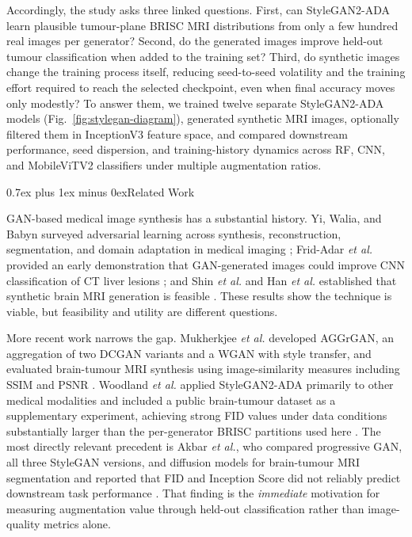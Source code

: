 \documentclass[conference,twoside]{IEEEtran}
\makeatletter
\newcommand{\figfont}{\sffamily}
\def\section{\@startsection{section}{1}{\z@}{1.5ex plus 1.5ex minus 0.5ex}%
{0.7ex plus 1ex minus 0ex}{\normalfont\normalsize\figfont\scshape\bfseries\centering}}
\makeatother
\begin{document}
Accordingly, the study asks three linked questions. First, can StyleGAN2-ADA learn plausible tumour-plane BRISC MRI distributions from only a few hundred real images per generator? Second, do the generated images improve held-out tumour classification when added to the training set? Third, do synthetic images change the training process itself, reducing seed-to-seed volatility and the training effort required to reach the selected checkpoint, even when final accuracy moves only modestly? To answer them, we trained twelve separate StyleGAN2-ADA models (Fig.~\ref{fig:stylegan-diagram}), generated synthetic MRI images, optionally filtered them in InceptionV3 feature space, and compared downstream performance, seed dispersion, and training-history dynamics across RF, CNN, and MobileViTV2 classifiers under multiple augmentation ratios.

\section{Related Work}

GAN-based medical image synthesis has a substantial history. Yi, Walia, and Babyn surveyed adversarial learning across synthesis, reconstruction, segmentation, and domain adaptation in medical imaging \cite{yi2019ganreview}; Frid-Adar \textit{et al.} provided an early demonstration that GAN-generated images could improve CNN classification of CT liver lesions \cite{fridadar2018livergan}; and Shin \textit{et al.} and Han \textit{et al.} established that synthetic brain MRI generation is feasible \cite{shin2018synthesis,han2018brainmri}. These results show the technique is viable, but feasibility and utility are different questions.

More recent work narrows the gap. Mukherkjee \textit{et al.} developed AGGrGAN, an aggregation of two DCGAN variants and a WGAN with style transfer, and evaluated brain-tumour MRI synthesis using image-similarity measures including SSIM and PSNR \cite{mukherjee2022aggrgan}. Woodland \textit{et al.} applied StyleGAN2-ADA primarily to other medical modalities and included a public brain-tumour dataset as a supplementary experiment, achieving strong FID values under data conditions substantially larger than the per-generator BRISC partitions used here \cite{woodland2022stylegan2ada}. The most directly relevant precedent is Akbar \textit{et al.}, who compared progressive GAN, all three StyleGAN versions, and diffusion models for brain-tumour MRI segmentation and reported that FID and Inception Score did not reliably predict downstream task performance \cite{akbar2024syntheticmri}. That finding is the \textit{immediate} motivation for measuring augmentation value through held-out classification rather than image-quality metrics alone.
\end{document}
